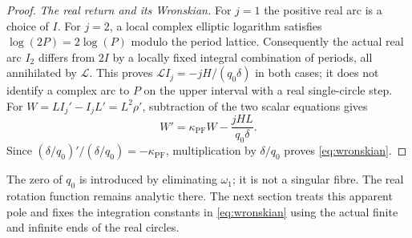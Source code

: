 \begin{proof}
\emph{The real return and its Wronskian.}
For $j=1$ the positive real arc is a choice of $I$.  For $j=2$, a local
complex elliptic logarithm satisfies
$\log(2P)=2\log(P)$ modulo the period lattice.  Consequently the actual
real arc $I_2$ differs from $2I$ by a locally fixed integral combination
of periods, all annihilated by $\mathcal L$.  This proves
$\mathcal L I_j=-jH/(q_0\delta)$ in both cases; it does not identify a
complex arc to $P$ on the upper interval with a real single-circle step.
For $W=L I_j'-I_jL'=L^2\rho'$, subtraction of the two scalar equations
gives
\[
W'=\kappa_{\mathrm{PF}}W-\frac{jHL}{q_0\delta}.
\]
Since $(\delta/q_0)'/(\delta/q_0)=-\kappa_{\mathrm{PF}}$,
multiplication by $\delta/q_0$ proves \eqref{eq:wronskian}.
\end{proof}

The zero of $q_0$ is introduced by eliminating $\omega_1$; it is not a
singular fibre.  The real rotation function remains analytic there.
The next section treats this apparent pole and fixes the integration
constants in \eqref{eq:wronskian} using the actual finite and infinite
ends of the real circles.
